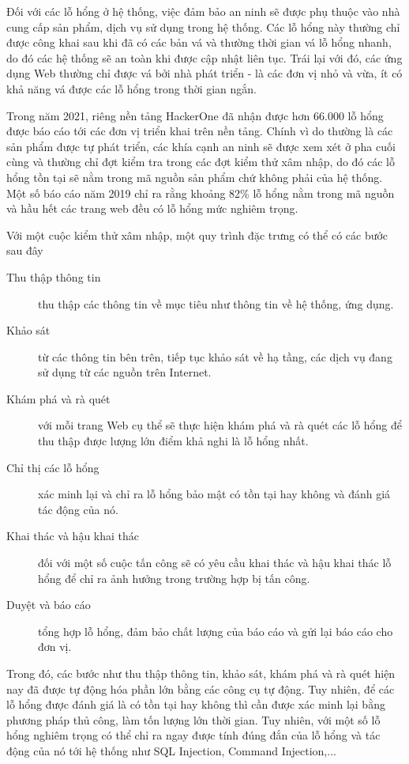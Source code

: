 \documentclass[./../main.tex]{subfiles}
\begin{document}
Đối với các lỗ hổng ở hệ thống, việc đảm bảo an ninh sẽ được phụ thuộc vào nhà cung cấp sản phẩm, dịch vụ sử dụng trong hệ thống.
Các lỗ hổng này thường chỉ được công khai sau khi đã có các bản vá và thường thời gian vá lỗ hổng nhanh, do đó các hệ thống sẽ an toàn khi được cập nhật liên tục.
Trái lại với đó, các ứng dụng Web thường chỉ được vá bởi nhà phát triển - là các đơn vị nhỏ và vừa, ít có khả năng vá được các lỗ hổng trong thời gian ngắn.

Trong năm 2021, riêng nền tảng HackerOne đã nhận được hơn 66.000 lỗ hổng được báo cáo tới các đơn vị triển khai trên nền tảng.
Chính vì do thường là các sản phẩm được tự phát triển, các khía cạnh an ninh sẽ được xem xét ở pha cuối cùng và thường chỉ đợt kiểm tra trong các đợt kiểm thử xâm nhập,
do đó các lỗ hổng tồn tại sẽ nằm trong mã nguồn sản phẩm chứ không phải của hệ thống. Một số báo cáo năm 2019 chỉ ra rằng khoảng 82\% lỗ hổng nằm trong mã nguồn và hầu hết
các trang web đều có lỗ hổng mức nghiêm trọng.

Với một cuộc kiểm thử xâm nhập, một quy trình đặc trưng có thể có các bước sau đây
\begin{description}
	\item [Thu thập thông tin] thu thập các thông tin về mục tiêu như thông tin về hệ thống, ứng dụng.
	\item [Khảo sát] từ các thông tin bên trên, tiếp tục khảo sát về hạ tầng, các dịch vụ đang sử dụng từ các nguồn trên Internet.
	\item [Khám phá và rà quét] với mỗi trang Web cụ thể sẽ thực hiện khám phá và rà quét các lỗ hổng để thu thập được lượng lớn điểm khả nghi là lỗ hổng nhất.
	\item [Chỉ thị các lỗ hổng] xác minh lại và chỉ ra lỗ hổng bảo mật có tồn tại hay không và đánh giá tác động của nó.
	\item [Khai thác và hậu khai thác] đối với một số cuộc tấn công sẽ có yêu cầu khai thác và hậu khai thác lỗ hổng để chỉ ra ảnh hưởng trong trường hợp bị tấn công.
	\item [Duyệt và báo cáo] tổng hợp lỗ hổng, đảm bảo chất lượng của báo cáo và gửi lại báo cáo cho đơn vị.
\end{description}
Trong đó, các bước như thu thập thông tin, khảo sát, khám phá và rà quét hiện nay đã được tự động hóa phần lớn bằng các công cụ tự động. Tuy nhiên, để các lỗ hổng được đánh giá
là có tồn tại hay không thì cần được xác minh lại bằng phương pháp thủ công, làm tốn lượng lớn thời gian. Tuy nhiên, với một số lỗ hổng nghiêm trọng có thể chỉ ra ngay được tính đúng
đắn của lỗ hổng và tác động của nó tới hệ thống như SQL Injection, Command Injection,...
\end{document}
